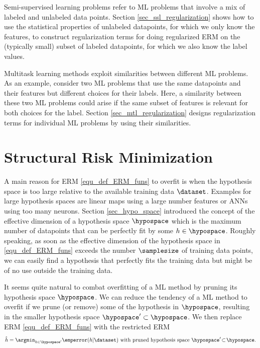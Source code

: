 \documentclass[12pt]{report}
\begin{document}
Semi-supervised learning problems refer to ML problems that involve a mix of 
labeled and unlabeled data points. Section \ref{sec_ssl_regularization} shows 
how to use the statistical properties of unlabeled datapoints, for which we only 
know the features, to construct regularization terms for doing regularized ERM 
on the (typically small) subset of labeled datapoints, for which we also 
know the label values. 

Multitask learning methods exploit similarities between different ML problems. 
As an example, consider two ML problems that use the same datapoints and 
their features but different choices for their labels. Here, a similarity between 
these two ML problems could arise if the same subset of features is relevant 
for both choices for the label. Section \ref{sec_mtl_regularization} designs 
regularization terms for individual ML problems by using their similarities. 



\section{Structural Risk Minimization} 
\label{sec_reg_ERM}

A main reason for ERM \eqref{equ_def_ERM_funs} to overfit is when the hypothesis space is 
too large relative to the available training data $\dataset$. Examples for large hypothesis spaces 
are linear maps using a large number features or ANNs using too many neurons. Section \ref{sec_hypo_space} 
introduced the concept of the effective dimension of a hypothesis space $\hypospace$ which 
is the maximum number of datapoints that can be perfectly fit by some $h \in \hypospace$. 
Roughly speaking, as soon as the effective dimension of the hypothesis space in \eqref{equ_def_ERM_funs} 
exceeds the number $\samplesize$ of training data points, we can easily find a hypothesis that 
perfectly fits the training data but might be of no use outside the training data. 

It seems quite natural to combat overfitting of a ML method by pruning its 
hypothesis space $\hypospace$. We can reduce the tendency of a ML method 
to overfit if we prune (or remove) some of the hypothesis in $\hypospace$, 
resulting in the smaller hypothesis space $\hypospace' \subset \hypospace$. 
We then replace ERM \eqref{equ_def_ERM_funs} with the restricted ERM 
\begin{equation}
\label{equ_ERM_fun_pruned}
\hat{h} = \argmin_{h \in \hypospace'} \emperror(h|\dataset) \mbox{ with pruned hypothesis space } \hypospace' \!\subset\!\hypospace. 
\end{equation}
\end{document}
